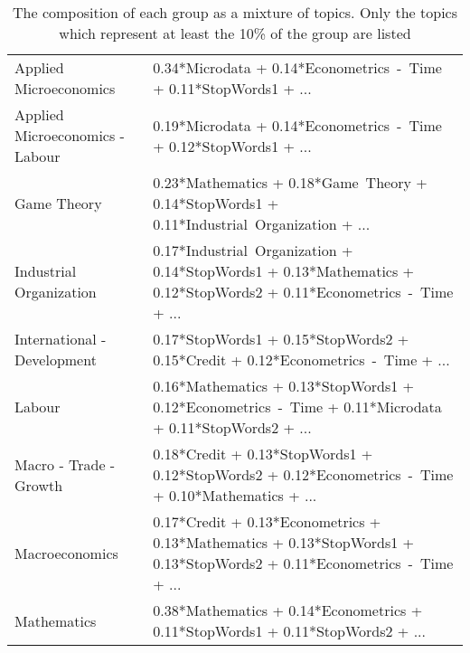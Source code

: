 \begin{table}[tb]
\centering
\caption[Groups-Topics]{The composition of each group as a mixture of topics. Only the topics which represent at least the 10\% of the group are listed}
\label{tab:gt}
\begin{tabularx}{\hsize}{lY}
\toprule
         Applied Microeconomics &                                                        0.34*Microdata + 0.14*Econometrics~-~Time + 0.11*StopWords1 + ... \\
Applied Microeconomics - Labour &                                                        0.19*Microdata + 0.14*Econometrics~-~Time + 0.12*StopWords1 + ... \\
                    Game Theory &                               0.23*Mathematics + 0.18*Game~Theory + 0.14*StopWords1 + 0.11*Industrial~Organization + ... \\
        Industrial Organization &     0.17*Industrial~Organization + 0.14*StopWords1 + 0.13*Mathematics + 0.12*StopWords2 + 0.11*Econometrics~-~Time + ... \\
    International - Development &                                         0.17*StopWords1 + 0.15*StopWords2 + 0.15*Credit + 0.12*Econometrics~-~Time + ... \\
                         Labour &                   0.16*Mathematics + 0.13*StopWords1 + 0.12*Econometrics~-~Time + 0.11*Microdata + 0.11*StopWords2 + ... \\
         Macro - Trade - Growth &                      0.18*Credit + 0.13*StopWords1 + 0.12*StopWords2 + 0.12*Econometrics~-~Time + 0.10*Mathematics + ... \\
                 Macroeconomics &  0.17*Credit + 0.13*Econometrics + 0.13*Mathematics + 0.13*StopWords1 + 0.13*StopWords2 + 0.11*Econometrics~-~Time + ... \\
                    Mathematics &                                           0.38*Mathematics + 0.14*Econometrics + 0.11*StopWords1 + 0.11*StopWords2 + ... \\
\bottomrule
\end{tabularx}
\end{table}
